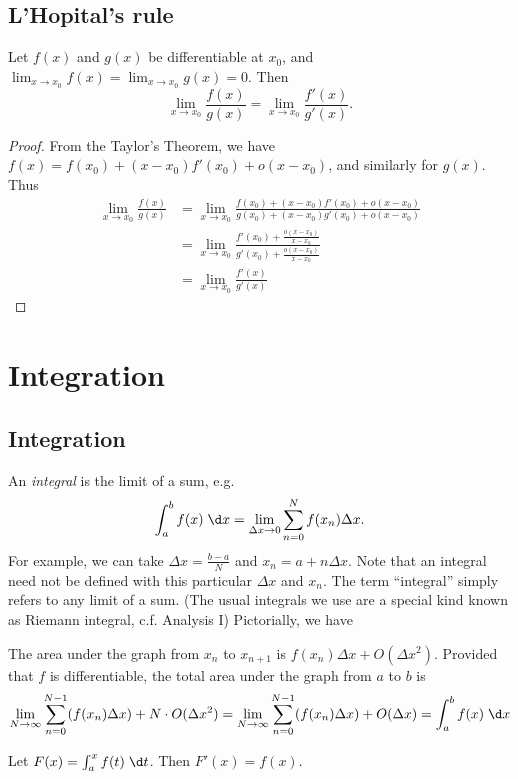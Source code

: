 \documentclass[a4paper]{article}
\begin{document}
\subsection{L'Hopital's rule}
\begin{thm}
  Let $f(x)$ and $g(x)$ be differentiable at $x_0$, and $\displaystyle \lim_{x\to x_0}f(x) = \lim_{x\to x_0}g(x) = 0$. Then
  \[
  \lim_{x\to x_0} \frac{f(x)}{g(x)} = \lim_{x\to x_0} \frac{f'(x)}{g'(x)}.
  \]
\end{thm}
\begin{proof}
  From the Taylor's Theorem, we have $f(x) = f(x_0) + (x - x_0)f'(x_0) + o(x - x_0)$, and similarly for $g(x)$. Thus
  \begin{align*}
    \lim_{x\to x_0} \frac{f(x)}{g(x)} &= \lim_{x\to x_0} \frac{f(x_0) + (x - x_0)f'(x_0) + o(x - x_0)}{g(x_0) + (x - x_0)g'(x_0) + o(x - x_0)}\\
    &= \lim_{x\to x_0} \frac{f'(x_0) + \frac{o(x-x_0)}{x-x_0}}{g'(x_0) + \frac{o(x-x_0)}{x-x_0}}\\
    &= \lim_{x\to x_0} \frac{f'(x)}{g'(x)}
  \end{align*}
\end{proof}

\section{Integration}
\subsection{Integration}
\begin{defi}[Integral]
  An \emph{integral} is the limit of a sum, e.g. 
  \[
  \int_a^b f(x) \;\d x = \lim_{\Delta x\to 0}\sum_{n=0}^N f(x_n)\Delta x.
  \]
  For example, we can take $\Delta x=\frac{b - a}{N}$ and $x_n = a + n\Delta x$. Note that an integral need not be defined with this particular $\Delta x$ and $x_n$. The term ``integral'' simply refers to any limit of a sum. (The usual integrals we use are a special kind known as Riemann integral, c.f. Analysis I) Pictorially, we have
\end{defi}

The area under the graph from $x_n$ to $x_{n+1}$ is $f(x_n)\Delta x + O(\Delta x^2)$. Provided that $f$ is differentiable, the total area under the graph from $a$ to $b$ is
\[
\lim_{N\to \infty} \sum_{n=0}^{N-1}(f(x_n)\Delta x) + N\cdot O(\Delta x^2) = \lim_{N\to \infty} \sum_{n=0}^{N-1}(f(x_n)\Delta x) + O(\Delta x) = \int_a^b f(x)\;\d x
\]
\begin{thm}
  Let $F(x) = \int_a^x f(t)\;\d t$. Then $F'(x) = f(x)$.
\end{thm}
\end{document}
